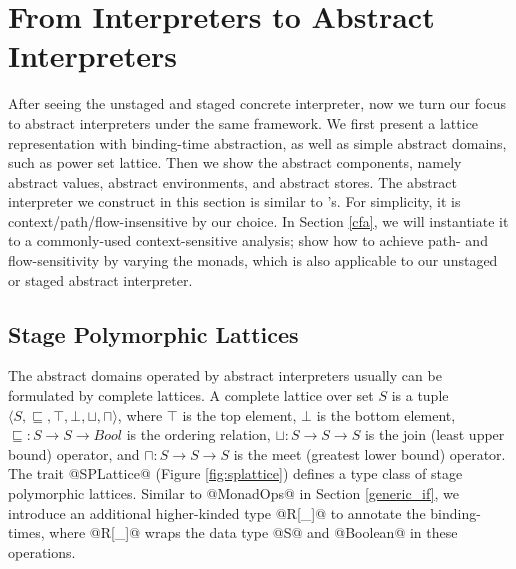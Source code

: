\section{From Interpreters to Abstract Interpreters} \label{unstaged_abs}

After seeing the unstaged and staged concrete interpreter, now we turn our
focus to abstract interpreters under the same framework. We first present a
lattice representation with binding-time abstraction, as well as simple
abstract domains, such as power set lattice.  Then we show the abstract
components, namely abstract values, abstract environments, and abstract stores.
The abstract interpreter we construct in this section is similar to
\citet{DBLP:journals/pacmpl/DaraisLNH17}'s. For simplicity, it is
context/path/flow-insensitive by our choice. In Section \ref{cfa}, we will
instantiate it to a commonly-used context-sensitive analysis;
\citet{Darais:2015:GTM:2814270.2814308} show how to achieve path- and
flow-sensitivity by varying the monads, which is also applicable to our
unstaged or staged abstract interpreter.

\subsection{Stage Polymorphic Lattices} \label{stagedpoly_lat}

The abstract domains operated by abstract interpreters usually can be
formulated by complete lattices.
A complete lattice over set $S$ is a tuple $\langle S, \sqsubseteq, \top,
\bot, \sqcup, \sqcap \rangle$, where $\top$ is the top element, $\bot$ is the
bottom element, $\sqsubseteq : S \to S \to Bool$ is the
ordering relation, $\sqcup: S \to S \to S$ is the join (least upper bound)
operator, and $\sqcap: S \to S \to S$ is the meet (greatest lower bound)
operator. The trait @SPLattice@ (Figure \ref{fig:splattice}) defines a type
class of stage polymorphic lattices. Similar to @MonadOps@ in Section
\ref{generic_if}, we introduce an additional higher-kinded type @R[_]@ to
annotate the binding-times, where @R[_]@ wraps the data type @S@ and @Boolean@
in these operations.

